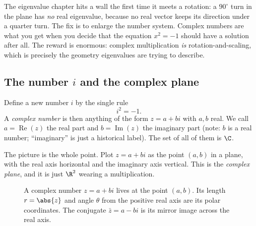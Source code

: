 The eigenvalue chapter hits a wall the first time it meets a rotation: a $90^\circ$ turn in the plane
has \emph{no} real eigenvalue, because no real vector keeps its direction under a quarter turn. The
fix is to enlarge the number system. Complex numbers are what you get when you decide that the
equation $x^2 = -1$ should have a solution after all. The reward is enormous: complex multiplication
\emph{is} rotation-and-scaling, which is precisely the geometry eigenvalues are trying to describe.

\subsection{The number $i$ and the complex plane}
\label{ch39:i}

Define a new number $i$ by the single rule
\[
i^2 = -1.
\]
A \emph{complex number} is then anything of the form $z = a + bi$ with $a, b$ real. We call $a =
\operatorname{Re}(z)$ the real part and $b = \operatorname{Im}(z)$ the imaginary part (note: $b$ is a
real number; ``imaginary'' is just a historical label). The set of all of them is $\C$.

The picture is the whole point. Plot $z = a + bi$ as the point $(a,b)$ in a plane, with the real
axis horizontal and the imaginary axis vertical. This is the \emph{complex plane}, and it is just
$\R^2$ wearing a multiplication.

\begin{figure}[H]
\centering
{}
\caption{A complex number $z = a+bi$ lives at the point $(a,b)$. Its length $r = \abs{z}$ and angle
$\theta$ from the positive real axis are its polar coordinates. The conjugate $\bar z = a - bi$ is
its mirror image across the real axis.}
\label{ch39:fig-plane}
\end{figure}


